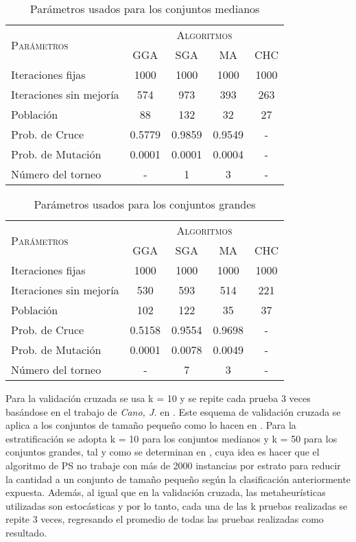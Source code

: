\begin{table}[]
\centering
\begin{tabular}{l c c c c}
\hline
\multirow{2}{*}{\textsc{Parámetros}}
	& \multicolumn{4}{c}{\textsc{Algoritmos}} \\
	& GGA & SGA & MA & CHC \\
\hline
\hline
Iteraciones fijas       &  1000    &  1000    &  1000      &  1000 \\
Iteraciones sin mejoría &    574   &   973    &    393     &   263 \\
Población               &    88    &    132   &    32      &    27 \\
Prob. de Cruce          &   0.5779 &   0.9859 &     0.9549 &     - \\
Prob. de Mutación       &   0.0001 &  0.0001  &     0.0004 &     - \\
Número del torneo       &   -      &    1     &     3      &     - \\
\hline
\end{tabular}
\caption{Parámetros usados para los conjuntos medianos}
\label{param-med}
\end{table}

\begin{table}[]
\centering
\begin{tabular}{l c c c c}
\hline
\multirow{2}{*}{\textsc{Parámetros}}
	& \multicolumn{4}{c}{\textsc{Algoritmos}} \\
	& GGA & SGA & MA & CHC \\
\hline
\hline
Iteraciones fijas       &  1000    &  1000    &  1000      &  1000 \\
Iteraciones sin mejoría &    530   &   593    &    514     &   221 \\
Población               &    102   &    122   &    35      &    37 \\
Prob. de Cruce          &   0.5158 &   0.9554 &     0.9698 &     - \\
Prob. de Mutación       &   0.0001 &  0.0078  &     0.0049 &     - \\
Número del torneo       &   -      &    7     &     3      &     - \\
\hline
\end{tabular}
\caption{Parámetros usados para los conjuntos grandes}
\label{param-grande}
\end{table}

Para la validación cruzada se usa k = 10 y se repite cada prueba 3 veces basándose en el trabajo de \emph{Cano, J.} en \cite{de2004reduccion}. Este esquema de validación cruzada se aplica a los conjuntos de tamaño pequeño como lo hacen en \cite{de2004reduccion}. Para la estratificación se adopta k = 10 para los conjuntos medianos y k = 50 para los conjuntos grandes, tal y como se determinan en \cite{cano2005stratification}, cuya idea es hacer que el algoritmo de PS no trabaje con más de 2000 instancias por estrato para reducir la cantidad a un conjunto de tamaño pequeño según la clasificación anteriormente expuesta. Además, al igual que en la validación cruzada, las metaheurísticas utilizadas son estocásticas y por lo tanto, cada una de las k pruebas realizadas se repite 3 veces, regresando el promedio de todas las pruebas realizadas como resultado.

